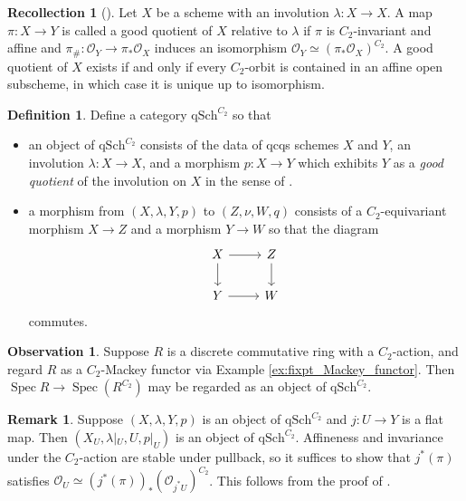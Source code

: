 \documentclass{article}
\DeclareMathOperator{\Spec}{Spec}
\theoremstyle{definition}
\newtheorem{definition}[equation]{Definition}
\newtheorem{remark}[equation]{Remark}
\newtheorem{observation}[equation]{Observation}
\newtheorem{recollection}[equation]{Recollection}
\newcommand{\Lucy}[1]{\todo[color=cyan]{\linespread{1}\footnotesize L: #1}}
\begin{document}
\begin{recollection} [{\cite[Remark 4.20]{azumaya_involution}}]
    Let $ X $ be a scheme with an involution $ \lambda \colon X \to X $. 
    A map $ \pi \colon X \to Y $ is called a good quotient of $ X $ relative to $ \lambda $ if $ \pi $ is $ C_2 $-invariant and affine and $ \pi_{\#} \colon \mathcal{O}_Y \to \pi_{*} \mathcal{O}_X $ induces an isomorphism $ \mathcal{O}_Y \simeq \left(\pi_{*} \mathcal{O}_X\right)^{C_2} $. 
    A good quotient of $ X $ exists if and only if every $ C_2 $-orbit is contained in an affine open subscheme, in which case it is unique up to isomorphism. 
\end{recollection}
\begin{definition}
    Define a category $ \mathrm{qSch}^{C_2} $ so that
    \begin{itemize}
        \item an object of $ \mathrm{qSch}^{C_2} $ consists of the data of qcqs schemes $ X $ and $ Y $, an involution $ \lambda \colon X \to X $, and a morphism $ p \colon X \to Y $ which exhibits $ Y $ as a \emph{good quotient} of the involution on $ X $ in the sense of \cite[Remark 4.20]{azumaya_involution}. 
        \item a morphism from $ (X,\lambda, Y, p) $ to $ (Z,\nu, W, q) $ consists of a $ C_2 $-equivariant morphism $ X \to Z $ and a morphism $ Y \to W $ so that the diagram
        \begin{equation*}
        \begin{tikzcd}
            X \ar[d] \ar[r] & Z \ar[d] \\
            Y \ar[r] & W
        \end{tikzcd}
        \end{equation*}
        commutes. 
    \end{itemize}
\end{definition}
\begin{observation}\label{obs:fixpt_Mackey_functor_as_affine_C2_scheme}
    Suppose $ R $ is a discrete commutative ring with a $ C_2 $-action, and regard $ R $ as a $ C_2 $-Mackey functor via Example \ref{ex:fixpt_Mackey_functor}. 
    Then $ \Spec R \to \Spec (R^{C_2}) $ may be regarded as an object of $ \mathrm{qSch}^{C_2} $. 
\end{observation}
\begin{remark}\label{remark:restriction_of_schemes_with_involution}
    Suppose $ (X,\lambda, Y, p) $ is an object of $ \mathrm{qSch}^{C_2} $ and $ j \colon U \to Y $ is a flat map. %
    Then $ (X_U, \lambda|_U, U, p|_U) $ is an object of $ \mathrm{qSch}^{C_2} $. 
    Affineness and invariance under the $ C_2 $-action are stable under pullback, so it suffices to show that $ j^*(\pi) $ satisfies $ \mathcal{O}_U \simeq \left(j^*(\pi)\right)_*(\mathcal{O}_{j^*U})^{C_2} $. 
    This follows from the proof of \cite[Theorem 4.35(i)]{azumaya_involution}.  
\end{remark}
\end{document}
